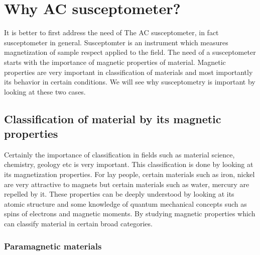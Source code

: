 

\section{Why AC susceptometer?}
It is better to first address the need of The AC susceptometer, in fact susceptometer in general. Susceptomter is an instrument which measures magnetization of sample respect applied to the field. The need of a susceptometer starts with the importance of magnetic properties of material. Magnetic properties are very important in classification of materials and most importantly its behavior in certain conditions. We will see why susceptometry is important by looking at these two cases.

\subsection{Classification of material by its magnetic properties}
Certainly the importance of classification in fields such as material science, chemistry, geology etc is very important. This classification is done by looking at its magnetization properties. For lay people, certain materials such as iron, nickel  are very attractive to magnets but certain materials such as water, mercury are repelled by it. These properties can be deeply understood by looking at its atomic structure and some knowledge of quantum mechanical concepts such as spins of electrons and magnetic moments. By studying magnetic properties which can classify material in certain broad categories.

\subsubsection{Paramagnetic materials}

